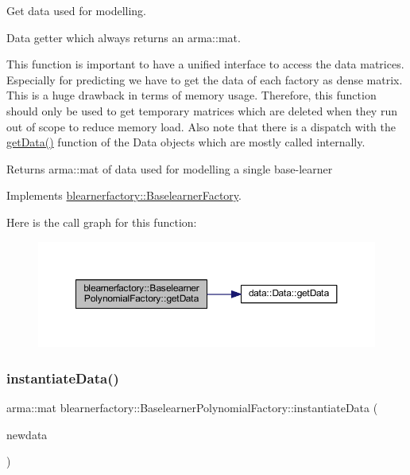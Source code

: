 Get data used for modelling. 

Data getter which always returns an arma\+::mat.

This function is important to have a unified interface to access the data matrices. Especially for predicting we have to get the data of each factory as dense matrix. This is a huge drawback in terms of memory usage. Therefore, this function should only be used to get temporary matrices which are deleted when they run out of scope to reduce memory load. Also note that there is a dispatch with the \mbox{\hyperlink{classblearnerfactory_1_1_baselearner_polynomial_factory_af6d997c89f2e81a490352f23dee1ef9d}{get\+Data()}} function of the Data objects which are mostly called internally.

\begin{DoxyReturn}{Returns}
{\ttfamily arma\+::mat} of data used for modelling a single base-\/learner 
\end{DoxyReturn}


Implements \mbox{\hyperlink{classblearnerfactory_1_1_baselearner_factory_aa3e4580bca870ca3b742dda6c820e1e6}{blearnerfactory\+::\+Baselearner\+Factory}}.

Here is the call graph for this function\+:
\nopagebreak
\begin{figure}[H]
\begin{center}
\leavevmode
\includegraphics[width=350pt]{classblearnerfactory_1_1_baselearner_polynomial_factory_af6d997c89f2e81a490352f23dee1ef9d_cgraph}
\end{center}
\end{figure}
\mbox{\label{classblearnerfactory_1_1_baselearner_polynomial_factory_ae8a2c70c75eb37e6c782d1bb17627272}} 
\subsubsection{\texorpdfstring{instantiate\+Data()}{instantiateData()}}
{\footnotesize\ttfamily arma\+::mat blearnerfactory\+::\+Baselearner\+Polynomial\+Factory\+::instantiate\+Data (\begin{DoxyParamCaption}\item[{const arma\+::mat \&}]{newdata }\end{DoxyParamCaption})\hspace{0.3cm}{\ttfamily [virtual]}}



